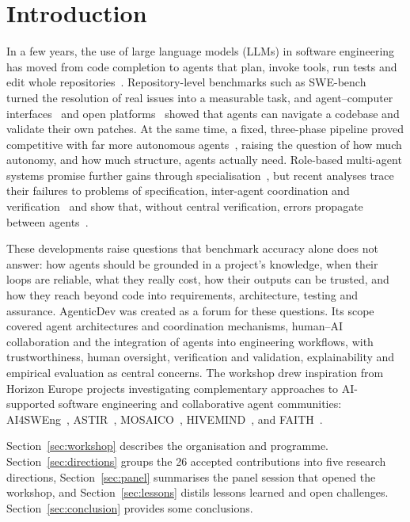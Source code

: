 \section{Introduction}
\label{sec:introduction}

In a few years, the use of large language models (LLMs) in software engineering has moved from code completion to agents that plan, invoke tools, run tests and edit whole repositories~\cite{hou2024llm4se}. Repository-level benchmarks such as SWE-bench~\cite{jimenez2024swebench} turned the resolution of real issues into a measurable task, and agent--computer interfaces~\cite{yang2024sweagent} and open platforms~\cite{wang2025openhands} showed that agents can navigate a codebase and validate their own patches. At the same time, a fixed, three-phase pipeline proved competitive with far more autonomous agents~\cite{xia2025agentless}, raising the question of how much autonomy, and how much structure, agents actually need. Role-based multi-agent systems promise further gains through specialisation~\cite{he2025mas4se}, but recent analyses trace their failures to problems of specification, inter-agent coordination and verification~\cite{cemri2025mast} and show that, without central verification, errors propagate between agents~\cite{kim2025scaling}.

These developments raise questions that benchmark accuracy alone does not answer: how agents should be grounded in a project's knowledge, when their loops are reliable, what they really cost, how their outputs can be trusted, and how they reach beyond code into requirements, architecture, testing and assurance. AgenticDev was created as a forum for these questions. Its scope covered agent architectures and coordination mechanisms, human--AI collaboration and the integration of agents into engineering workflows, with trustworthiness, human oversight, verification and validation, explainability and empirical evaluation as central concerns. The workshop drew inspiration from Horizon Europe projects investigating complementary approaches to AI-supported software engineering and collaborative agent communities: AI4SWEng~\cite{proj:ai4sweng}, ASTIR~\cite{proj:astir}, MOSAICO~\cite{proj:mosaico}, HIVEMIND~\cite{proj:hivemind}, and FAITH~\cite{proj:faith}.

Section~\ref{sec:workshop} describes the organisation and programme. Section~\ref{sec:directions} groups the 26 accepted contributions into five research directions, Section~\ref{sec:panel} summarises the panel session that opened the workshop, and Section~\ref{sec:lessons} distils lessons learned and open challenges. Section~\ref{sec:conclusion} provides some conclusions.
